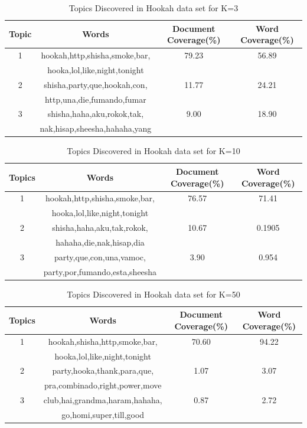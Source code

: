 \documentclass[11pt,a4paper,oneside]{article}
\begin{document}
\begin{table}
\begin{tabular}{|c|c|c|c|}
\hline 
Topic & Words & Document Coverage(\%) & Word Coverage(\%) \\ 
\hline 
1 & hookah,http,shisha,smoke,bar, & 79.23 & 56.89 \\ 
& hooka,lol,like,night,tonight & & \\
\hline 
2 & shisha,party,que,hookah,con, & 11.77 & 24.21 \\ 
& http,una,die,fumando,fumar & & \\
\hline 
3 & shisha,haha,aku,rokok,tak, & 9.00 & 18.90 \\ 
& nak,hisap,sheesha,hahaha,yang & & \\
\hline 
\end{tabular}
\caption{Topics Discovered in Hookah data set for K=3}
\label{table:k=3_hookah}
\end{table}

\begin{table}
\begin{tabular}{|c|c|c|c|}
\hline 
Topics & Words & Document Coverage(\%) & Word Coverage(\%) \\ 
\hline 
1 & hookah,http,shisha,smoke,bar, & 76.57 & 71.41 \\ 
& hooka,lol,like,night,tonight & & \\
\hline 
2 & shisha,haha,aku,tak,rokok, & 10.67 & 0.1905 \\ 
& hahaha,die,nak,hisap,dia & & \\
\hline 
3 & party,que,con,una,vamoc, & 3.90 & 0.954 \\ 
& party,por,fumando,esta,sheesha & & \\
\hline 
\end{tabular}
\caption{Topics Discovered in Hookah data set for K=10}
\label{table:k=10_hookah}
\end{table}

\begin{table}
\begin{tabular}{|c|c|c|c|}
\hline 
Topics & Words & Document Coverage(\%) & Word Coverage(\%) \\ 
\hline 
1 & hookah,shisha,http,smoke,bar, & 70.60 & 94.22 \\ 
& hooka,lol,like,night,tonight & & \\
\hline 
2 & party,hooka,thank,para,que, & 1.07 & 3.07 \\ 
& pra,combinado,right,power,move & & \\
\hline 
3 & club,hai,grandma,haram,hahaha, & 0.87 & 2.72 \\ 
& go,homi,super,till,good & & \\
\hline 
\end{tabular}
\caption{Topics Discovered in Hookah data set for K=50}
\label{table:k=50_hookah}
\end{table}
\end{document}
